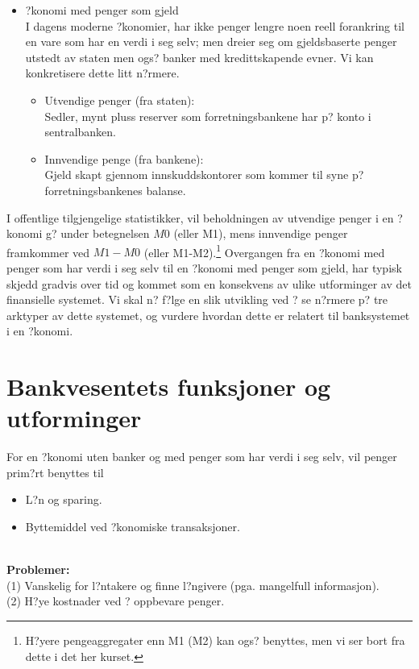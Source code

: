 \documentclass[a4paper,notitlepage]{article}
\begin{document}
\begin{itemize}
 \item ?konomi med penger som gjeld\\
I dagens moderne ?konomier, har ikke penger lengre noen reell forankring til en vare som har en verdi i seg selv; men dreier seg om gjeldsbaserte penger utstedt av staten men ogs? banker med kredittskapende evner. Vi kan konkretisere dette litt n?rmere.
\begin{itemize}
\item Utvendige penger (fra staten):\\
Sedler, mynt pluss reserver som forretningsbankene har p? konto i sentralbanken.
\item Innvendige penge (fra bankene):\\
Gjeld skapt gjennom innskuddskontorer som kommer til syne p? forretningsbankenes balanse.
\end{itemize}
\end{itemize}
I offentlige tilgjengelige statistikker, vil beholdningen av utvendige penger i en ?konomi g? under betegnelsen $M0$ (eller M1), mens innvendige penger framkommer ved $M1-M0$ (eller M1-M2).\footnote{H?yere pengeaggregater enn M1 (M2) kan ogs? benyttes, men vi ser bort fra dette i det her kurset.}
Overgangen fra en ?konomi med penger som har verdi i seg selv til en ?konomi med penger som gjeld, har typisk skjedd gradvis over tid og kommet som en konsekvens av ulike utforminger av det finansielle systemet. Vi skal n? f?lge en slik utvikling ved ? se n?rmere p? tre arktyper av dette systemet, og vurdere hvordan dette er relatert til banksystemet i en ?konomi.
\section{Bankvesentets funksjoner og utforminger}
For en ?konomi uten banker og med penger som har verdi i seg selv, vil penger prim?rt benyttes til
\begin{itemize}
\item L?n og sparing.
\item Byttemiddel ved ?konomiske transaksjoner.
\end{itemize}
\noindent\textbf{\\ Problemer:}\\
(1) Vanskelig for l?ntakere og finne l?ngivere (pga. mangelfull informasjon).\\
(2) H?ye kostnader ved ? oppbevare penger. \\
\end{document}
